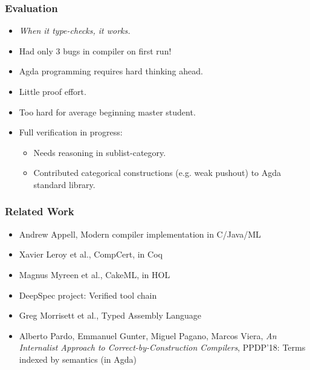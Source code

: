 \documentclass[t,fleqn,usenames,dvipsnames]{beamer}
\newcommand{\cAnn}{\color{red!80!black}}%
\renewcommand{\emph}[1]{{\cAnn#1}}
\newcommand{\cType}{\color{orange!60!black}}
\renewcommand{\emph}[1]{\textit{\cType#1}}
\begin{document}
\begin{frame}%
  \frametitle{Evaluation}
  \vspace{-3ex}
  \begin{itemize}
  \item \emph{When it type-checks, it works.}
  \item Had only 3 bugs in compiler on first run!
  \item Agda programming requires hard thinking ahead.
  \item Little proof effort.
  \item Too hard for average beginning master student.
  \item Full verification in progress:
    \begin{itemize}
    \item Needs reasoning in sublist-category.
    \item Contributed categorical constructions (e.g. weak pushout) to Agda standard library.
    \end{itemize}
  \end{itemize}
\end{frame}





\begin{frame}%
  \frametitle{Related Work}
  \begin{itemize}
  \item Andrew Appell, Modern compiler implementation in C/Java/ML
  \item Xavier Leroy et al., CompCert, in Coq
  \item Magnus Myreen et al., CakeML, in HOL
  \item DeepSpec project: Verified tool chain
  \item Greg Morrisett et al., Typed Assembly Language
  \item Alberto Pardo, Emmanuel Gunter, Miguel Pagano, Marcos Viera,
\emph{An Internalist Approach to Correct-by-Construction Compilers},  PPDP'18:
Terms indexed by semantics (in Agda)
  \end{itemize}
\end{frame}
\end{document}
